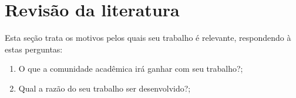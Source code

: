 

\section{Revisão da literatura}
\label{sec:Revisao-da-literatura}

Esta seção trata os motivos pelos quais seu trabalho é relevante, respondendo à estas perguntas:
\begin{enumerate}
    \item O que a comunidade acadêmica irá ganhar com seu trabalho?;
    \item Qual a razão do seu trabalho ser desenvolvido?;
\end{enumerate}
